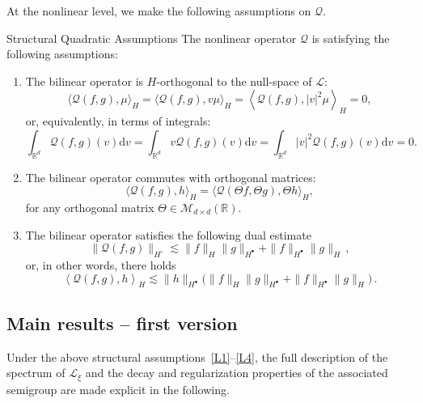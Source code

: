 \documentclass[10pt]{amsart}
\theoremstyle{definition}\newtheorem{defi}[theo]{Definition}\newtheorem{rema}[theo]{Remark}\newtheorem{exam}[theo]{Example}\newtheorem{exem}[theo]{Example}\newtheorem{nota}[theo]{Notation}
\renewcommand{\d}{\mathrm{d}}
\newcommand{\R}{\mathbb{R}}
\newcommand{\LL}{\mathcal{L}}
\newcommand{\QQ}{\mathcal{Q}}
\newcommand{\MMM}{\mathscr{M}}
\newcommand{\Ss}{H}
\newcommand{\Ssp}{H^{\bullet}}
\newcommand{\Ssm}{H^{\circ}}
\newcommand{\la}{\langle}
\newcommand{\ra}{\rangle}
\newcommand{\lla}{\left\langle}
\newcommand{\rra}{\right\rangle}
\newcommand*{\relabel}{\renewcommand{\labelenumi}{(\theenumi)}}
\newcommand*{\Benumi}{\renewcommand*{\theenumi}{\textbf{B\arabic{enumi}}}\relabel}
\begin{document}
At the nonlinear level, we make the following assumptions on $\QQ$.

\begin{enonce}
{Structural Quadratic Assumptions}\label{AsB1}
The nonlinear operator $\QQ$ is satisfying the following assumptions:
\begin{enumerate}\Benumi
\item \label{Bortho}
The bilinear operator is $\Ss$-orthogonal to the null-space of $\LL$:
\[
\la \QQ(f, g), \mu \ra_{\Ss} = \la \QQ(f, g), v \mu \ra_{\Ss} = \left\la \QQ(f, g), |v|^2 \mu \right\ra_{\Ss} = 0,
\]
or, equivalently, in terms of integrals:
\[
\int_{\R^d} \QQ(f, g)(v) \d v = \int_{\R^d} v \QQ(f, g)(v) \d v = \int_{\R^d} |v|^2 \QQ(f, g)(v) \d v = 0.
\]
\item \label{Bisotrop}
The bilinear operator commutes with orthogonal matrices:
\[
\la \QQ(f, g), h \ra_{\Ss} = \big\la \QQ\left(\Theta f, \Theta g \right), \Theta h \big\ra_{\Ss},
\]
for any orthogonal matrix $\Theta \in \MMM_{d \times d}(\R).$
\item \label{Bbound}
The bilinear operator satisfies the following dual estimate
\[
\| \QQ(f, g) \|_{\Ssm} \lesssim \| f \|_{\Ss} \| g \|_{\Ssp} + \| f \|_{\Ssp} \| g \|_{\Ss}\,,
\]
or, in other words, there holds
\[
\lla \QQ(f, g), h \rra_{\Ss} \lesssim \| h \|_{\Ssp} \big(\| f \|_{\Ss} \| g \|_{\Ssp} + \| f \|_{\Ssp} \| g \|_{\Ss} \big)\,.
\]
\end{enumerate}
\end{enonce}


\subsection{Main results -- first version}

Under the above structural assumptions~\eqref{L1}--\eqref{L4}, the full description of the spectrum of $\LL_{\xi}$ and the decay {and regularization properties} of the associated semigroup are made explicit in the following.
\end{document}
